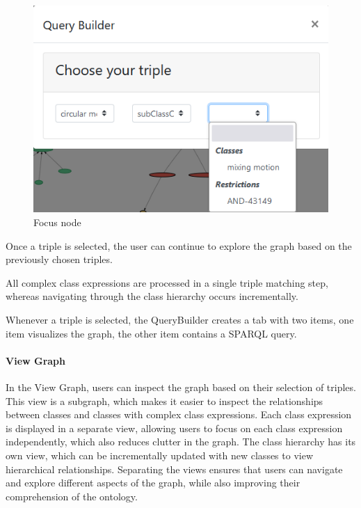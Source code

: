 \begin{figure}[H]
    \includegraphics[scale=0.4]{Graphics/OwlVisualizer/queryBuilder3.png}
    \centering
    \caption{Focus node}
\end{figure}
Once a triple is selected, the user can continue to explore the graph based on the previously chosen triples.

All complex class expressions are processed in a single triple matching step, whereas navigating through the class hierarchy occurs incrementally.

Whenever a triple is selected, the QueryBuilder creates a tab with two items, one item visualizes the graph, the other item 
contains a SPARQL query. 
\paragraph{View Graph}
In the View Graph, users can inspect the graph based on their selection of triples. 
This view is a subgraph, which makes it easier to inspect the relationships between classes and classes with complex class expressions. 
Each class expression is displayed in a separate view, allowing users to focus on each class expression independently, which also reduces clutter in the graph. 
The class hierarchy has its own view, which can be incrementally updated with new classes to view hierarchical relationships. 
Separating the views ensures that users can navigate and explore different aspects of the graph, while also improving their comprehension of the ontology.

